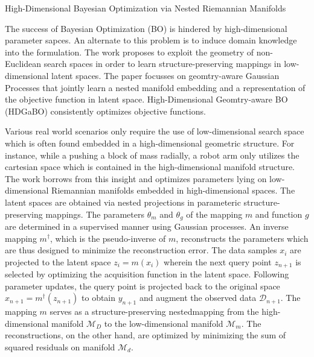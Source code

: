 \documentclass[12pt,letterpaper]{article}
\begin{document}
\begin{center}
  \large{High-Dimensional Bayesian Optimization
  via Nested Riemannian Manifolds}
\end{center}

The success of Bayesian Optimization (BO) is hindered by high-dimensional parameter sapces. An alternate to this problem is to induce domain knowledge into the formulation. The work proposes to exploit the geometry of non-Euclidean search spaces in order to learn structure-preserving mappings in low-dimensional latent spaces. The paper focusses on geomtry-aware Gaussian Processes that jointly learn a nested manifold embedding and a representation of the objective function in latent space. High-Dimensional Geomtry-aware BO (HDGaBO) consistently optimizes objective functions.

Various real world scenarios only require the use of low-dimensional search space which is often found embedded in a high-dimensional geometric structure. For instance, while a pushing a block of mass radially, a robot arm only utilizes the cartesian space which is contained in the high-dimensional manifold structure. The work borrows from this insight and optimizes parameters lying on low-dimensional Riemannian manifolds embedded in high-dimensional spaces. The latent spaces are obtained via nested projections in parameteric structure-preserving mappings. The parameters $\theta_{m}$ and $\theta_{g}$ of the mapping $m$ and function $g$ are determined in a supervised manner using Gaussian processes. An inverse mapping $m^{\dag}$, which is the pseudo-inverse of $m$, reconstructs the parameters which are thus designed to minimize the reconstruction error. The data samples $x_{i}$ are projected to the latent space $z_{i} = m(x_{i})$ wherein the next query point $z_{n+1}$ is selected by optimizing the acquisition function in the latent space. Following parameter updates, the query point is projected back to the original space $x_{n+1} = m^{\dag}(z_{n+1})$ to obtain $y_{n+1}$ and augment the observed data $\mathcal{D}_{n+1}$. The mapping $m$ serves as a structure-preserving nestedmapping from the high-dimensional manifold $\mathcal{M}_{D}$ to the low-dimensional manifold $\mathcal{M}_{m}$. The reconstructions, on the other hand, are optimized by minimizing the sum of squared residuals on manifold $\mathcal{M}_{d}$.
\end{document}
